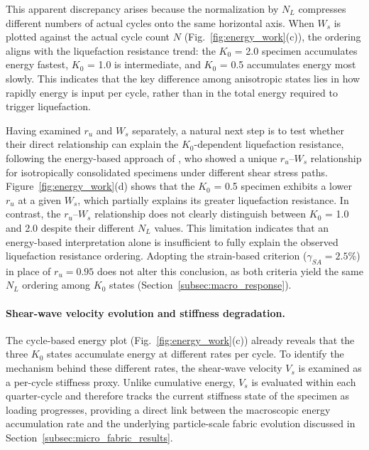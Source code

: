 \documentclass[a4paper,fleqn]{cas-sc}
\newcommand{\Kzero}{\ensuremath{K_0}}
\newcommand{\Vs}{\ensuremath{V_s}}
\newcommand{\ru}{\ensuremath{r_u}}
\begin{document}
This apparent discrepancy arises because the normalization by $N_L$ compresses different numbers of actual cycles onto the same horizontal axis. When $W_s$ is plotted against the actual cycle count $N$ (Fig.~\ref{fig:energy_work}(c)), the ordering aligns with the liquefaction resistance trend: the \Kzero{} = 2.0 specimen accumulates energy fastest, \Kzero{} = 1.0 is intermediate, and \Kzero{} = 0.5 accumulates energy most slowly. This indicates that the key difference among anisotropic states lies in how rapidly energy is input per cycle, rather than in the total energy required to trigger liquefaction.

Having examined $\ru$ and $W_s$ separately, a natural next step is to test whether their direct relationship can explain the \Kzero{}-dependent liquefaction resistance, following the energy-based approach of \citet{TowhataIshihara1985}, who showed a unique $\ru$--$W_s$ relationship for isotropically consolidated specimens under different shear stress paths. Figure~\ref{fig:energy_work}(d) shows that the \Kzero{} = 0.5 specimen exhibits a lower $\ru$ at a given $W_s$, which partially explains its greater liquefaction resistance. In contrast, the $\ru$--$W_s$ relationship does not clearly distinguish between \Kzero{} = 1.0 and 2.0 despite their different $N_L$ values. This limitation indicates that an energy-based interpretation alone is insufficient to fully explain the observed liquefaction resistance ordering. Adopting the strain-based criterion ($\gamma_{SA}=2.5\%$) in place of $\ru=0.95$ does not alter this conclusion, as both criteria yield the same $N_L$ ordering among \Kzero{} states (Section~\ref{subsec:macro_response}).

\paragraph{Shear-wave velocity evolution and stiffness degradation.}
The cycle-based energy plot (Fig.~\ref{fig:energy_work}(c)) already reveals that the three \Kzero{} states accumulate energy at different rates per cycle. To identify the mechanism behind these different rates, the shear-wave velocity \Vs{} is examined as a per-cycle stiffness proxy. Unlike cumulative energy, \Vs{} is evaluated within each quarter-cycle and therefore tracks the current stiffness state of the specimen as loading progresses, providing a direct link between the macroscopic energy accumulation rate and the underlying particle-scale fabric evolution discussed in Section~\ref{subsec:micro_fabric_results}.
\end{document}
